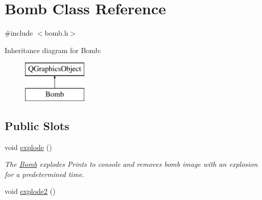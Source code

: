 \hypertarget{class_bomb}{\section{Bomb Class Reference}
\label{class_bomb}
}


{\ttfamily \#include $<$bomb.\-h$>$}

Inheritance diagram for Bomb\-:\begin{figure}[H]
\begin{center}
\leavevmode
\includegraphics[height=2.000000cm]{class_bomb}
\end{center}
\end{figure}
\subsection*{Public Slots}
\begin{DoxyCompactItemize}
\item 
void \hyperlink{class_bomb_a5752ce7daece5c3bf2e2178bcfcb820d}{explode} ()
\begin{DoxyCompactList}\small\item\em The \hyperlink{class_bomb}{Bomb} explodes Prints to console and removes bomb image with an explosion for a predetermined time. \end{DoxyCompactList}\item 
void \hyperlink{class_bomb_ae9410dc9b499dad8e4f0f200d9b0ead7}{explode2} ()
\end{DoxyCompactItemize}
